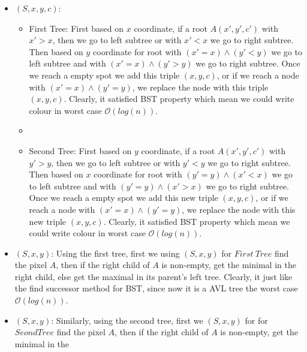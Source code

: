 \documentclass[11pt,twoside]{article}
\begin{document}
\begin{enumerate}[leftmargin=0pt]
\begin{enumerate}
\begin{itemize}
\begin{itemize} [label={}]
						$x$ coordinate for root with $(y'=y)\wedge (x'< x)$ we go to left subtree and with $(y'= y)\wedge (x'>x)$ we go to right subtree. Else, with $(x' = x) \wedge (y' = y)$ we just read the colour. 
						Clearly, it satisfied BST property which mean we could return colours in worst case $\mathcal{O}(log(n))$.
						\end{itemize}
				\item	{}$(S, x, y, c)$: 
						\begin{itemize} [label={}]
						\item First Tree: First based on  $x$ coordinate,  if a root $A(x', y', c')$ with $x'>x$, then we go to left subtree or with $x'<x$ we go to right subtree. Then based on 
						$y$ coordinate for root with $(x'=x)\wedge (y'< y)$ we go to left subtree and with $(x'= x)\wedge (y'>y)$ we go to right subtree. Once we reach a empty spot we add this triple $(x,y,c)$, or if we reach a 
						node with $(x' = x) \wedge (y' = y)$, we replace the node with this triple $(x,y,c).$ Clearly, it satisfied BST property which mean we could write colour in worst case $\mathcal{O}(log(n))$.
						\item
						\item Second Tree: First based on  $y$ coordinate,  if a root $A(x', y', c')$ with $y'>y$, then we go to left subtree or with $y'<y$ we go to right subtree. Then based on 
						$x$ coordinate for root with $(y'=y)\wedge (x'< x)$ we go to left subtree and with $(y'= y)\wedge (x'>x)$ we go to right subtree. Once we reach a empty spot we add this new triple $(x,y,c)$, or if we reach
						a node with $(x' = x) \wedge (y' = y)$, we replace the node with this new triple $(x,y,c).$ Clearly, it satisfied BST property which mean we could write colour in worst case $\mathcal{O}(log(n))$.
						\end{itemize}
				\item	{}$(S, x, y)$: Using the first tree, first we using $(S, x, y)$ for $First \ Tree$ find the pixel $A$, then if the right child of $A$ is non-empty, get the minimal in the right child, else 						get the maximal in its parent's left tree. Clearly, it just like the find successor method for BST, since now it is a AVL tree the worst case $\mathcal{O}(log(n))$.
				\item	{}$(S, x, y)$: Similarly,  using the second tree, first we $(S, x, y)$ for for $Seond Tree$ find the pixel $A$, then if the right child of $A$ is non-empty, get the minimal in the 

\end{itemize}
\end{enumerate}
\end{enumerate}
\end{document}
